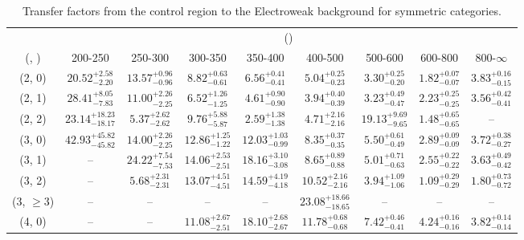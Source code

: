 \begin{table}[h!]
\tiny
\centering
\caption{Transfer factors from the \mmj control region to the Electroweak background for symmetric categories.\label{tab:tf_mumu_total_sym}}
\begin{tabular}
{ccccccccc}
	\hline\hline
	& \multicolumn{8}{c}{\scalht (\gev)} \\ 
	 (\njet,  \nb) & 200-250 & 250-300 & 300-350 & 350-400 & 400-500 & 500-600 & 600-800 & 800-$\infty$ \\ [0.8ex] 
\hline
	(2, 0) & $20.52^{+ 2.58 }_{- 2.20 }$ & $13.57^{+ 0.96 }_{- 0.96 }$ & $8.82^{+ 0.63 }_{- 0.61 }$ & $6.56^{+ 0.41 }_{- 0.41 }$ & $5.04^{+ 0.25 }_{- 0.23 }$ & $3.30^{+ 0.25 }_{- 0.20 }$ & $1.82^{+ 0.07 }_{- 0.07 }$ & $3.83^{+ 0.16 }_{- 0.15 }$ \\[0.5ex] 
	(2, 1) & $28.41^{+ 8.05 }_{- 7.83 }$ & $11.00^{+ 2.26 }_{- 2.25 }$ & $6.52^{+ 1.26 }_{- 1.25 }$ & $4.61^{+ 0.90 }_{- 0.90 }$ & $3.94^{+ 0.40 }_{- 0.39 }$ & $3.23^{+ 0.49 }_{- 0.47 }$ & $2.23^{+ 0.25 }_{- 0.25 }$ & $3.56^{+ 0.42 }_{- 0.41 }$ \\[0.5ex] 
	(2, 2) & $23.14^{+ 18.23 }_{- 18.17 }$ & $5.37^{+ 2.62 }_{- 2.62 }$ & $9.76^{+ 5.88 }_{- 5.87 }$ & $2.59^{+ 1.38 }_{- 1.38 }$ & $4.71^{+ 2.16 }_{- 2.16 }$ & $19.13^{+ 9.69 }_{- 9.65 }$ & $1.48^{+ 0.65 }_{- 0.65 }$ & -- \\[0.5ex] 
	(3, 0) & $42.93^{+ 45.82 }_{- 45.82 }$ & $14.00^{+ 2.26 }_{- 2.25 }$ & $12.86^{+ 1.25 }_{- 1.22 }$ & $12.03^{+ 1.03 }_{- 0.99 }$ & $8.35^{+ 0.37 }_{- 0.35 }$ & $5.50^{+ 0.61 }_{- 0.49 }$ & $2.89^{+ 0.09 }_{- 0.09 }$ & $3.72^{+ 0.38 }_{- 0.27 }$ \\[0.5ex] 
	(3, 1) & -- & $24.22^{+ 7.54 }_{- 7.53 }$ & $14.06^{+ 2.53 }_{- 2.51 }$ & $18.16^{+ 3.10 }_{- 3.08 }$ & $8.65^{+ 0.89 }_{- 0.88 }$ & $5.01^{+ 0.71 }_{- 0.63 }$ & $2.55^{+ 0.22 }_{- 0.22 }$ & $3.63^{+ 0.49 }_{- 0.42 }$ \\[0.5ex] 
	(3, 2) & -- & $5.68^{+ 2.31 }_{- 2.31 }$ & $13.07^{+ 4.51 }_{- 4.51 }$ & $14.59^{+ 4.19 }_{- 4.18 }$ & $10.52^{+ 2.16 }_{- 2.16 }$ & $3.94^{+ 1.09 }_{- 1.06 }$ & $1.09^{+ 0.29 }_{- 0.29 }$ & $1.80^{+ 0.73 }_{- 0.72 }$ \\[0.5ex] 
	(3, $\ge3$) & -- & -- & -- & -- & $23.08^{+ 18.66 }_{- 18.65 }$ & -- & -- & -- \\[0.5ex] 
	(4, 0) & -- & -- & $11.08^{+ 2.67 }_{- 2.51 }$ & $18.10^{+ 2.68 }_{- 2.67 }$ & $11.78^{+ 0.68 }_{- 0.68 }$ & $7.42^{+ 0.46 }_{- 0.41 }$ & $4.24^{+ 0.16 }_{- 0.16 }$ & $3.82^{+ 0.14 }_{- 0.14 }$ \\[0.5ex] 

\end{tabular}
\end{table}
